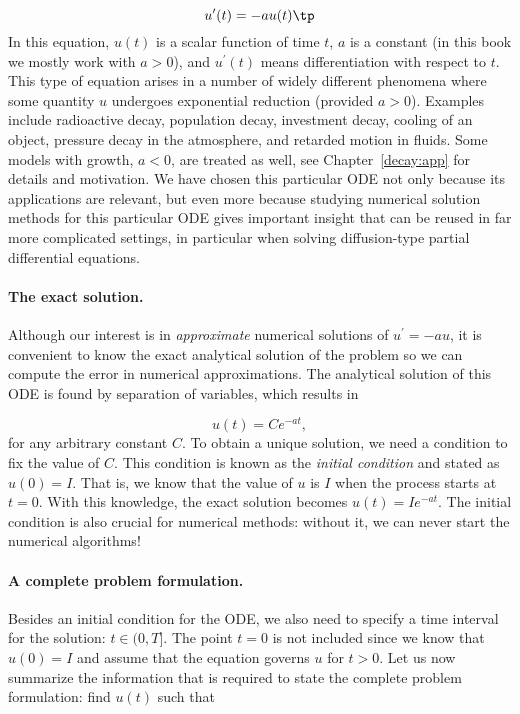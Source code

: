 \documentclass[graybox,sectrefs,envcountresetchap,open=right,final]{svmonodo}
\begin{document}
\begin{equation*}
u^{\prime}(t) = -au(t)\tp
\end{equation*}
In this equation, $u(t)$ is a scalar function of time $t$,
$a$ is a constant (in this book we mostly work with $a>0$),
and $u^{\prime}(t)$ means differentiation with
respect to $t$. This type of equation arises in a number of
widely different phenomena where some quantity $u$ undergoes
exponential reduction (provided $a>0$).
Examples include radioactive decay, population
decay, investment decay, cooling of an object, pressure decay in the
atmosphere, and retarded motion in fluids. Some models with growth,
$a < 0$, are treated as
well, see Chapter~\ref{decay:app} for details and motivation.
We have chosen this particular ODE not only because
its applications are relevant, but even more because studying
numerical solution methods for this particular ODE gives important insight
that can be reused in far more complicated settings, in particular
when solving diffusion-type partial differential equations.

\paragraph{The exact solution.}
Although our interest is in \emph{approximate} numerical solutions of
$u^{\prime}=-au$, it is convenient to know the exact analytical
solution of the problem so we can compute the error in numerical
approximations.  The analytical solution of this ODE is found by
separation of variables, which results in

\begin{equation*} u(t) = Ce^{-at},\end{equation*}
for any arbitrary constant $C$.
To obtain a unique solution, we need a condition to fix the value of $C$.
This condition is known as the \emph{initial condition} and stated as
$u(0)=I$. That is, we know that the value of $u$ is $I$ when the process
starts at $t=0$. With this knowledge, the exact solution becomes
$u(t)=Ie^{-at}$. The initial condition is also crucial for numerical
methods: without it, we can never start the numerical algorithms!

\paragraph{A complete problem formulation.}
Besides an initial condition for the ODE, we also need to specify a
time interval for the solution: $t\in (0,T]$.
The point $t=0$ is not
included since we know that $u(0)=I$ and assume that the equation governs
$u$ for $t>0$.
Let us now summarize the information that is required to
state the complete problem formulation:
find $u(t)$
such that
\end{document}
